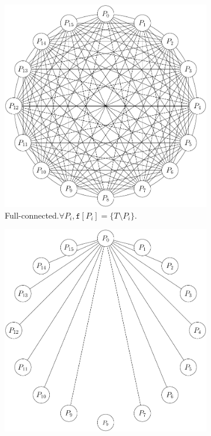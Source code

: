 \documentclass{article}
\begin{document}
\pagestyle{empty}

\begin{figure}
  \centering
  \begin{subfigure}[t]{0.3\textwidth}
    \centering
    \includegraphics[width=\textwidth]{full-mesh}
    \caption{Full-connected.\newline $\forall P_i, \mathtt{f}[P_i]=\{T\setminus P_i\}$.}
    \label{fig:full}
  \end{subfigure}
  \hfill
  \begin{subfigure}[t]{0.3\textwidth}
    \centering
    \includegraphics[width=\textwidth]{star}

\end{subfigure}
\end{figure}
\end{document}
